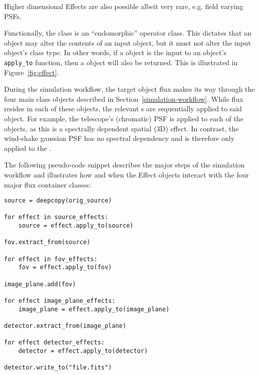 Higher dimensional Effects are also possible albeit very rare, e.g. field varying PSFs.

Functionally, the \Effect{} class is an ``endomorphic'' operator class.
This dictates that an \Effect{} object may alter the contents of an input object, but it must not alter the input object's class type.
In other words, if a \Source{} object is the input to an \Effect{} object's \lstinline{apply_to} function, then a \Source{} object will also be returned.
This is illustrated in Figure~\ref{fig:effect}.

During the simulation workflow, the target object flux makes its way through the four main class objects described in Section~\ref{simulation-workflow}.
While flux resides in each of these objects, the relevant \Effect{}s are sequentially applied to said object.
For example, the telescope's (chromatic) PSF is applied to each of the \FieldOfView{} objects, as this is a spectrally dependent spatial (3D) effect.
In contrast, the wind-shake gaussian PSF has no spectral dependency and is therefore only applied to the \ImagePlane{}.

The following pseudo-code snippet describes the major steps of the simulation workflow and illustrates how and when the Effect objects interact with the four major flux container classes:

\begin{lstlisting}[frame=single]
source = deepcopy(orig_source)

for effect in source_effects:
    source = effect.apply_to(source)

fov.extract_from(source)

for effect in fov_effects:
    fov = effect.apply_to(fov)

image_plane.add(fov)

for effect image_plane_effects:
    image_plane = effect.apply_to(image_plane)

detector.extract_from(image_plane)

for effect detector_effects:
    detector = effect.apply_to(detector)

detector.write_to("file.fits")
\end{lstlisting}

